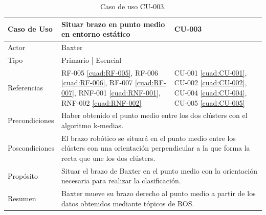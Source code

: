 \begin{table}[H]
	\centering
	\begin{tabular}{|p{2.5cm} | p{6cm} | p{5cm} |}
		\hline
		\textbf{Caso de Uso} & Situar brazo en punto medio en entorno estático & \textbf{CU-003} \\
		\hline 
		Actor & \multicolumn{2}{|l|}{Baxter} \\
		\hline
		Tipo & \multicolumn{2}{|l|}{Primario | Esencial} \\
		\hline
		Referencias & RF-005 \ref{cuad:RF-005}, RF-006 \ref{cuad:RF-006}, RF-007 \ref{cuad:RF-007}, RNF-001 \ref{cuad:RNF-001}, RNF-002 \ref{cuad:RNF-002} & CU-001 \ref{cuad:CU-001}, CU-002 \ref{cuad:CU-002}, CU-004 \ref{cuad:CU-004}, CU-005 \ref{cuad:CU-005} \\
		\hline
		Precondiciones & \multicolumn{2}{|l|}{\parbox{30em}{Haber obtenido el punto medio entre los dos clústers con el algoritmo k-medias.}} \\
		\hline
		Poscondiciones & \multicolumn{2}{|l|}{\parbox{30em}{El brazo robótico se situará en el punto medio entre los clústers con una orientación perpendicular a la que forma la recta que une los dos clústers.}}\\
		\hline
		Propósito & \multicolumn{2}{|l|}{\parbox{30em}{Situar el brazo de Baxter en el punto medio con la orientación necesaria para realizar la clasificación.}} \\
		\hline
		Resumen & \multicolumn{2}{|l|}{\parbox{30em}{Baxter mueve su brazo derecho al punto medio a partir de los datos obtenidos mediante tópicos de ROS.}} \\
		\hline
		
	\end{tabular}
	\caption{Caso de uso CU-003.}
	\label{cuad:CU-003}
\end{table}

